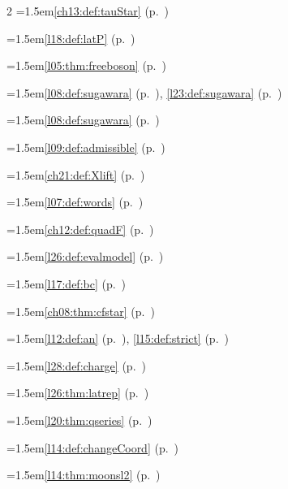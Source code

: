 \begin{multicols}{2}
\hangindent=1.5em\quad \ref{ch13:def:tauStar} (p.~\pageref{ch13:def:tauStar})\par
\hangindent=1.5em\quad \ref{l18:def:latP} (p.~\pageref{l18:def:latP})\par
\hangindent=1.5em\quad \ref{l05:thm:freeboson} (p.~\pageref{l05:thm:freeboson})\par
\hangindent=1.5em\quad \ref{l08:def:sugawara} (p.~\pageref{l08:def:sugawara}), \ref{l23:def:sugawara} (p.~\pageref{l23:def:sugawara})\par
\hangindent=1.5em\quad \ref{l08:def:sugawara} (p.~\pageref{l08:def:sugawara})\par
\hangindent=1.5em\quad \ref{l09:def:admissible} (p.~\pageref{l09:def:admissible})\par
\hangindent=1.5em\quad \ref{ch21:def:Xlift} (p.~\pageref{ch21:def:Xlift})\par
\hangindent=1.5em\quad \ref{l07:def:words} (p.~\pageref{l07:def:words})\par
\hangindent=1.5em\quad \ref{ch12:def:quadF} (p.~\pageref{ch12:def:quadF})\par
\hangindent=1.5em\quad \ref{l26:def:evalmodel} (p.~\pageref{l26:def:evalmodel})\par
\hangindent=1.5em\quad \ref{l17:def:bc} (p.~\pageref{l17:def:bc})\par
\hangindent=1.5em\quad \ref{ch08:thm:cfstar} (p.~\pageref{ch08:thm:cfstar})\par
\hangindent=1.5em\quad \ref{l12:def:an} (p.~\pageref{l12:def:an}), \ref{l15:def:strict} (p.~\pageref{l15:def:strict})\par
\hangindent=1.5em\quad \ref{l28:def:charge} (p.~\pageref{l28:def:charge})\par
\hangindent=1.5em\quad \ref{l26:thm:latrep} (p.~\pageref{l26:thm:latrep})\par
\hangindent=1.5em\quad \ref{l20:thm:qseries} (p.~\pageref{l20:thm:qseries})\par
\hangindent=1.5em\quad \ref{l14:def:changeCoord} (p.~\pageref{l14:def:changeCoord})\par
\hangindent=1.5em\quad \ref{l14:thm:moonsl2} (p.~\pageref{l14:thm:moonsl2})\par

\end{multicols}
